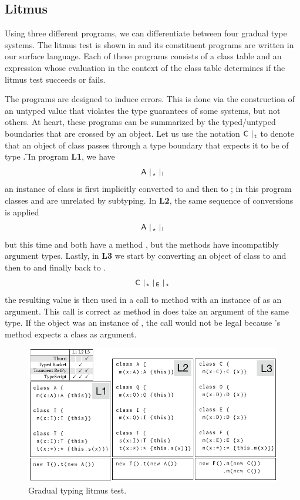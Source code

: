 \documentclass[USenglish]{tex/lipics-v2016}
\begin{document}
\subsection{Litmus}

Using three different programs, we can differentiate between four gradual
type systems. The litmus test is shown in  and its
constituent programs are written in our surface language.  Each of these
programs consists of a class table and an expression whose evaluation in
the context of the class table determines if the litmus test succeeds or
fails.

The programs are designed to induce errors.  This is done via the
construction of an untyped value that violates the type guarantees of some
systems, but not others.  At heart, these programs can be summarized by the
typed/untyped boundaries that are crossed by an object. Let us use the
notation $\C ~\vert_{\,\t}$ to denote that an object of class \C passes
through a type boundary that expects it to be of type \t.  In program {\bf
  L1}, we have \[{\sf{A}} ~\vert_{\,\star} ~ \vert_{\,{\sf{I}}}\] an instance of class \A
is first implicitly converted to \any and then to \I; in this program
classes \A and \I are unrelated by subtyping. In {\bf L2}, the same sequence
of conversions is applied
\[{\sf{A}}~ \vert_{\,\star} ~ \vert_{\,{\sf{I}}}\] but this time \A and \I both have a
method \m, but the methods have incompatibly argument types.  Lastly, in
{\bf L3} we start by converting an object of class \C to \any and then to \E
and finally back to \any.
\[\C~ \vert_{\,\any}~\vert_{\,\E}~\vert_{\,\any}\]
the resulting value is then used in a call to method \m with an instance of
\C as an argument. This call is correct as method \m in \C does take an
argument of the same type. If the object was an instance of \E, the call
would not be legal because \E's method \m expects a class \D as argument.

\begin{figure}[!h] \includegraphics[width=.95\columnwidth]{../figures/litm}
  \caption{Gradual typing litmus test.}\label{litmus}
\end{figure}
\end{document}
